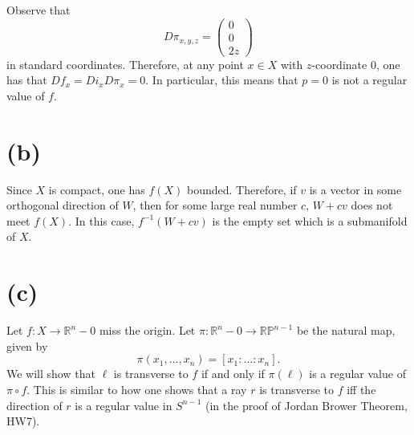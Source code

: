 \documentclass{amsbook}
\theoremstyle{theorem}
\theoremstyle{plain}
\theoremstyle{remark}
\newcommand{\R}{\mathbb R}
\renewcommand{\P}{\mathbb P}
\begin{document}
Observe that \[D\pi_{x,y,z} =
  \begin{pmatrix}
    0 \\ 0 \\ 2z
  \end{pmatrix}\] in standard coordinates. Therefore, at any point $x\in X$ with $z$-coordinate $0$, one has that $Df_x = Di_x D\pi_x = 0$. In particular, this means that $p = 0$ is not a regular value of $f$.
\section*{(b)}
Since $X$ is compact, one has $f(X)$ bounded. Therefore, if $v$ is a vector in some orthogonal direction of $W$, then for some large real number $c$, $W + cv$ does not meet $f(X)$. In this case, $f^{-1}(W+cv)$ is the empty set which is a submanifold of $X$.

\section*{(c)}
Let $f:X \to \R^n - 0$ miss the origin. Let $\pi: \R^n - 0 \to \R\P^{n-1}$ be the natural map, given by \[\pi(x_1, \dots, x_n) = [x_1:\dots:x_n].\] We will show that $\ell$ is transverse to $f$ if and only if $\pi (\ell)$ is a regular value of $\pi \circ f$. This is similar to how one shows that a ray $r$ is transverse to $f$ iff the direction of $r$ is a regular value in $S^{n-1}$ (in the proof of Jordan Brower Theorem, HW7).
\end{document}
